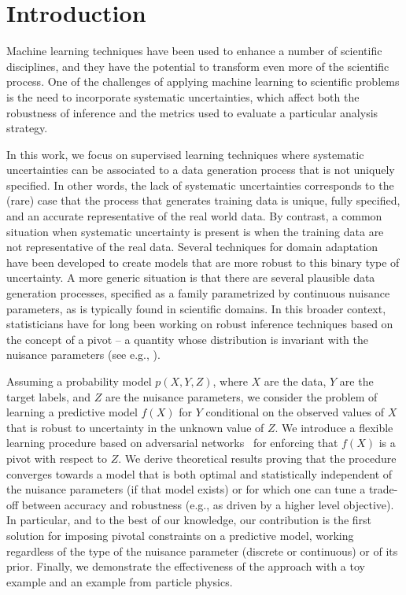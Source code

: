 \documentclass{article}
\theoremstyle{plain}
\begin{document}

\section{Introduction}

Machine learning techniques have been used to enhance a number of scientific
disciplines, and they have the potential to transform even more of the
scientific process. One of the challenges of applying machine learning
to scientific problems is the need to incorporate systematic
uncertainties, which affect both the
robustness of inference and the metrics used to evaluate a
particular analysis strategy.

In this work, we focus on supervised learning techniques where
systematic uncertainties can be associated to a data generation
process that is not uniquely specified. In other words, the lack of systematic
uncertainties corresponds to the (rare) case that the process that generates
training data is unique, fully specified, and an accurate representative of the
real world data. By contrast, a common situation when systematic uncertainty is
present is when the training data are not representative of the real data.
Several techniques for domain
adaptation have been developed to create models that are more robust
to this binary type of uncertainty.
A more generic situation is that there are several
plausible data generation processes, specified as a family
parametrized by continuous nuisance parameters, as is typically found in scientific domains.
In this broader context, statisticians have for long been working on robust inference techniques
based on the concept of a pivot -- a quantity whose distribution is invariant
with the nuisance parameters (see e.g., \citep{degroot1986probability}).

Assuming a probability model $p(X,Y,Z)$, where $X$ are the data, $Y$ are the
target labels, and $Z$ are the nuisance parameters, we consider the problem of
learning a predictive model $f(X)$ for $Y$ conditional on the observed values of $X$
that is robust to uncertainty in the unknown value of $Z$. We
introduce a flexible learning procedure based on adversarial networks~\citep{goodfellow2014generative}
for enforcing that  $f(X)$ is a pivot with respect to $Z$.
We derive theoretical results proving that the procedure
converges towards a model that is both optimal and statistically independent of the
nuisance parameters (if that model exists) or for which one can tune a
trade-off between accuracy and robustness (e.g., as driven by a higher level objective).
In particular, and to the best of our knowledge, our contribution is the first
solution for imposing pivotal constraints on a predictive model,
working regardless of the type of
the nuisance parameter (discrete or continuous) or of its prior.
Finally, we demonstrate the
effectiveness of the approach with a toy example and an example from particle physics.
\end{document}

